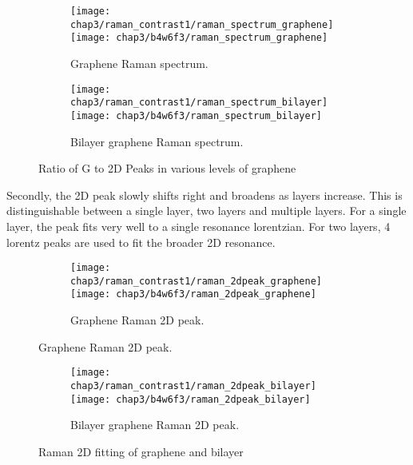 \documentclass[../Matt_Gebert_Honours_Thesis.tex]{subfiles}
\begin{document}
\begin{figure}[H]
	\begin{subfigure}{\textwidth}
		\texttt{[image: chap3/raman\_contrast1/raman\_spectrum\_graphene]}
		\texttt{[image: chap3/b4w6f3/raman\_spectrum\_graphene]}
		\caption{Graphene Raman spectrum.}
	\end{subfigure}
	\begin{subfigure}{\textwidth}
		\texttt{[image: chap3/raman\_contrast1/raman\_spectrum\_bilayer]}
		\texttt{[image: chap3/b4w6f3/raman\_spectrum\_bilayer]}
		\caption{Bilayer graphene Raman spectrum.}
	\end{subfigure}
	\caption[Ratio of G to 2D peaks in graphene and bilayer]{Ratio of G to 2D Peaks in various levels of graphene}\label{fig:raman_data_1}
\end{figure}

Secondly, the 2D peak slowly shifts right and broadens as layers increase. This is distinguishable between a single layer, two layers and multiple layers. For a single layer, the peak fits very well to a single resonance lorentzian. For two layers, 4 lorentz peaks are used to fit the broader 2D resonance.

\begin{figure}[H]
	\begin{subfigure}{\textwidth}
		\texttt{[image: chap3/raman\_contrast1/raman\_2dpeak\_graphene]}
		\texttt{[image: chap3/b4w6f3/raman\_2dpeak\_graphene]}
		\caption{Graphene Raman 2D peak.}
	\end{subfigure}
\end{figure}
\begin{figure}[H]
	\ContinuedFloat
	\begin{subfigure}{\textwidth}
		\texttt{[image: chap3/raman\_contrast1/raman\_2dpeak\_bilayer]}
		\texttt{[image: chap3/b4w6f3/raman\_2dpeak\_bilayer]}
		\caption{Bilayer graphene Raman 2D peak.}
	\end{subfigure}
	\caption{Raman 2D fitting of graphene and bilayer}\label{fig:raman_data_2}
\end{figure}
\end{document}
